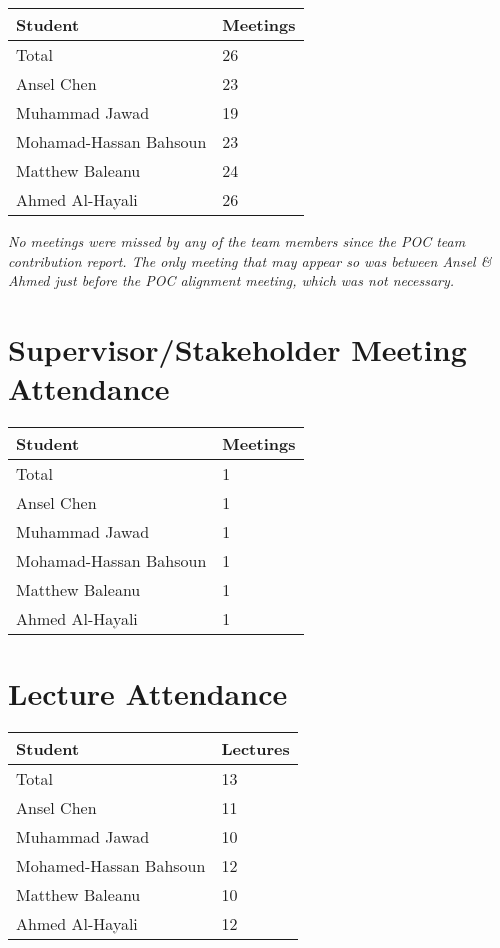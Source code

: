 \documentclass{article}
\begin{document}
\begin{table}[H]
\centering
\begin{tabular}{ll}
\toprule
\textbf{Student} & \textbf{Meetings}\\
\midrule
Total & 26\\
Ansel Chen & 23\\
Muhammad Jawad & 19\\
Mohamad-Hassan Bahsoun & 23\\
Matthew Baleanu & 24\\
Ahmed Al-Hayali & 26\\
\bottomrule
\end{tabular}
\end{table}

\emph{No meetings were missed by any of the team members since the POC team contribution report. The only meeting that may appear so was between Ansel \& Ahmed just before the POC alignment meeting, which was not necessary.}

\section{Supervisor/Stakeholder Meeting Attendance}

\begin{table}[H]
\centering
\begin{tabular}{ll}
\toprule
\textbf{Student} & \textbf{Meetings}\\
\midrule
Total & 1\\
Ansel Chen & 1\\
Muhammad Jawad & 1\\
Mohamad-Hassan Bahsoun & 1\\
Matthew Baleanu & 1\\
Ahmed Al-Hayali & 1\\
\bottomrule
\end{tabular}
\end{table}

\section{Lecture Attendance}

\begin{table}[H]
\centering
\begin{tabular}{ll}
\toprule
\textbf{Student} & \textbf{Lectures}\\
\midrule
Total & 13\\
Ansel Chen & 11\\
Muhammad Jawad & 10\\
Mohamed-Hassan Bahsoun & 12\\
Matthew Baleanu & 10\\
Ahmed Al-Hayali & 12\\
\bottomrule
\end{tabular}
\end{table}
\end{document}
